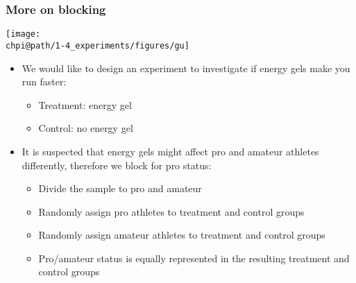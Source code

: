 \documentclass[slidestop,compress,mathserif]{beamer}
\makeatletter
\def\chpi@path{../../Chp 1}  %
\makeatother
\begin{document}
\begin{frame}
	\frametitle{More on blocking}

	{
	\begin{center}
	\texttt{[image: \\chpi@path/1-4\_experiments/figures/gu]}
	\end{center}
	}
	{
	\begin{itemize}
		\item We would like to design an experiment to investigate if energy gels make you run faster:
		\pause
		\begin{itemize}
			\item Treatment: energy gel
			\item Control: no energy gel
		\end{itemize}
		\pause
		\item It is suspected that energy gels might affect pro and amateur athletes differently, therefore we block for pro status:
		\pause
		\begin{itemize}
			\item Divide the sample to pro and amateur
			\item Randomly assign pro athletes to treatment and control groups
			\item Randomly assign amateur athletes to treatment and control groups
			\item Pro/amateur status is equally represented in the resulting treatment and control groups
		\end{itemize}
	\end{itemize}
	}

	\pause

\end{frame}




\end{document}

